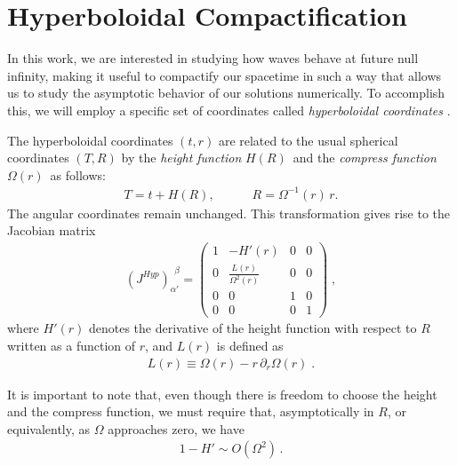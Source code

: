 \section{Hyperboloidal Compactification}
\label{section:compactification}

In this work, we are interested in studying how waves behave at future null infinity, making it useful to compactify our spacetime in such a way that allows us to study the asymptotic behavior of our solutions numerically. To accomplish this, we will employ a specific set of coordinates called \textit{hyperboloidal coordinates} \cite{Hyperboloidal_layers_for_hyperbolic_equations_on_unbounded_domains,The_evolution_of_hyperboloidal_data_with_the_dual_foliation_formalism_Mathematical_analysis_and_wave_equation_tests}. 

The hyperboloidal coordinates $(t, r)$ are related to the usual spherical coordinates $(T, R)$ by the \textit{height function} $H(R)$~and the \textit{compress function} $\Omega(r)$~as follows:
%
\begin{align}
 T = t + H(R), 
     \quad \quad \quad R = \Omega^{-1}(r) \, r.
\end{align}
%
The angular coordinates remain unchanged. This transformation gives rise to the Jacobian matrix
%
\begin{align}
    \left(J^{Hyp}\right)_{\alpha'}^{\ \ \beta} = 
    \begin{pmatrix}
        1 & -H'(r) & 0 & 0 \\
        0 & \frac{L(r)}{\Omega^2(r)} & 0 & 0 \\
        0 & 0 & 1 & 0 \\
        0 & 0 & 0 & 1
    \end{pmatrix} \; ,
\end{align}
%
where $H'(r)$ denotes the derivative of the height function with respect to $R$ written as a function of $r$, and $L(r)$ is defined as
%
\begin{align}
 L(r) \equiv \Omega(r) - r \, \partial_r \Omega(r) \; .
\end{align}

It is important to note that, even though there is freedom to choose the height and the compress function, we must require that, asymptotically in $R$, or equivalently, as $\Omega$ approaches zero, we have
%
\begin{align}
    1 - H' \sim O(\Omega^2) \, .
\end{align}

